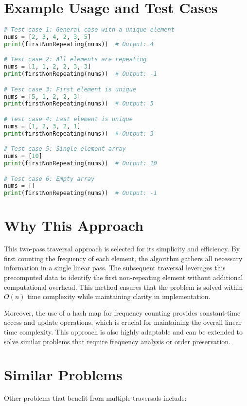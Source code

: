 \section*{Example Usage and Test Cases}

\begin{lstlisting}[language=Python]
# Test case 1: General case with a unique element
nums = [2, 3, 4, 2, 3, 5]
print(firstNonRepeating(nums))  # Output: 4

# Test case 2: All elements are repeating
nums = [1, 1, 2, 2, 3, 3]
print(firstNonRepeating(nums))  # Output: -1

# Test case 3: First element is unique
nums = [5, 1, 2, 2, 3]
print(firstNonRepeating(nums))  # Output: 5

# Test case 4: Last element is unique
nums = [1, 2, 3, 2, 1]
print(firstNonRepeating(nums))  # Output: 3

# Test case 5: Single element array
nums = [10]
print(firstNonRepeating(nums))  # Output: 10

# Test case 6: Empty array
nums = []
print(firstNonRepeating(nums))  # Output: -1
\end{lstlisting}

\section*{Why This Approach}

This two-pass traversal approach is selected for its simplicity and efficiency. By first counting the frequency of each element, the algorithm gathers all necessary information in a single linear pass. The subsequent traversal leverages this precomputed data to identify the first non-repeating element without additional computational overhead. This method ensures that the problem is solved within \(O(n)\) time complexity while maintaining clarity in implementation.

Moreover, the use of a hash map for frequency counting provides constant-time access and update operations, which is crucial for maintaining the overall linear time complexity. This approach is also highly adaptable and can be extended to solve similar problems that require frequency analysis or order preservation.

\section*{Similar Problems}

Other problems that benefit from multiple traversals include:

